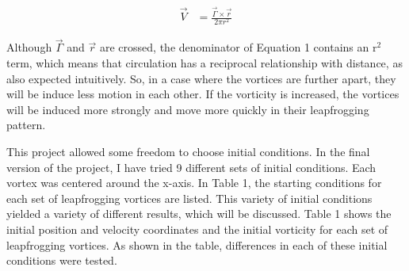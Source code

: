 \documentclass{article}
\begin{document}
{\begin{equation} \label{eq:1}
    \begin{aligned}
        \vec{V} &= \frac{\vec{\Gamma} \times \vec{r}}{2 \pi r^2}
    \end{aligned}
\end{equation}

Although $\vec{\Gamma}$ and $\vec{r}$ are crossed, the denominator of Equation 1 contains an r$^2$ term, which means that circulation has a reciprocal relationship with distance, as also expected intuitively. So, in a case where the vortices are further apart, they will be induce less motion in each other. If the vorticity is increased, the vortices will be induced more strongly and move more quickly in their leapfrogging pattern. \newline

This project allowed some freedom to choose initial conditions. In the final version of the project, I have tried 9 different sets of initial conditions. Each vortex was centered around the x-axis. In Table 1, the starting conditions for each set of leapfrogging vortices are listed. This variety of initial conditions yielded a variety of different results, which will be discussed. Table 1 shows the initial position and velocity coordinates and the initial vorticity for each set of leapfrogging vortices. As shown in the table, differences in each of these initial conditions were tested. \newline

}
\end{document}
